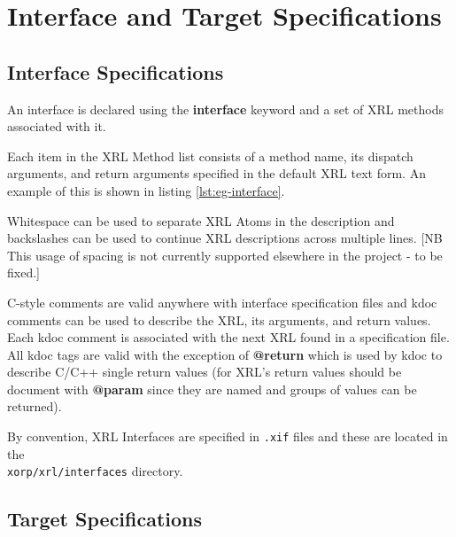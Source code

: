 \documentclass[11pt]{article}
\begin{document}
\section{Interface and Target Specifications}

\subsection{Interface Specifications}

An interface is declared using the \textbf{interface} keyword and a
set of XRL methods associated with it.

\smallskip
\noindent{}

\smallskip Each item in the XRL Method list consists of a method name, its
dispatch arguments, and return arguments specified in the default XRL
text form.  An example of this is shown in listing \ref{lst:eg-interface}.



Whitespace can be used to separate XRL Atoms in the description and
backslashes can be used to continue XRL descriptions across multiple
lines.  [NB This usage of spacing is not currently supported
elsewhere in the project - to be fixed.]

C-style comments are valid anywhere with interface specification files
and kdoc comments can be used to describe the XRL, its arguments, and
return values.  Each kdoc comment is associated with the next XRL
found in a specification file.  All kdoc tags are valid with the
exception of \textbf{@return} which is used by kdoc to describe C/C++
single return values (for XRL's return values should be document with
\textbf{@param} since they are named and groups of values can be
returned).

By convention, XRL Interfaces are specified in \texttt{.xif} files and these
are located in the \\
\texttt{xorp/xrl/interfaces} directory.

\subsection{Target Specifications}
\end{document}
